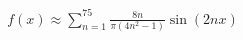 \documentclass[preview]{standalone}
\begin{document}
\begin{align*}
f(x) \approx \sum_{n=1}^{75} \frac{8n}{\pi(4n^2-1)} \sin(2nx)
\end{align*}
\end{document}
